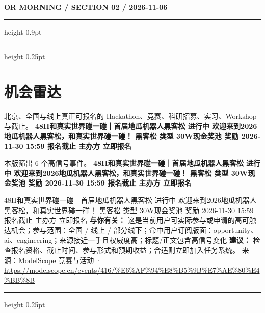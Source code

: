\documentclass[10.5pt]{ctexart}
\begin{document}
\newpage
{\small\bfseries OR MORNING / SECTION 02 / 2026-11-06}
\vspace{2mm}
\hrule height 0.9pt
\vspace{1.5mm}
\hrule height 0.25pt
\vspace{4mm}
\section*{机会雷达}
{\color{ormuted} 北京、全国与线上真正可报名的 Hackathon、竞赛、科研招募、实习、Workshop 与截止。}
\vspace{2mm}
{\LARGE\bfseries 48H和真实世界碰一碰｜首届地瓜机器人黑客松 进行中 欢迎来到2026地瓜机器人黑客松，和真实世界碰一碰！ 黑客松 类型 30W现金奖池 奖励 2026-11-30 15:59 报名截止 主办方 立即报名}\par
\vspace{1mm}
{\color{ormuted} 本版筛出 6 个高信号事件。}
\vspace{3mm}
{\Large\bfseries 48H和真实世界碰一碰｜首届地瓜机器人黑客松 进行中 欢迎来到2026地瓜机器人黑客松，和真实世界碰一碰！ 黑客松 类型 30W现金奖池 奖励 2026-11-30 15:59 报名截止 主办方 立即报名}\par
48H和真实世界碰一碰｜首届地瓜机器人黑客松 进行中 欢迎来到2026地瓜机器人黑客松，和真实世界碰一碰！ 黑客松 类型 30W现金奖池 奖励 2026-11-30 15:59 报名截止 主办方 立即报名
\textbf{与你有关：} 这是当前用户可实际参与或申请的高可触达机会；参与范围：全国 / 线上 / 部分线下；命中用户订阅版面：opportunity、ai、engineering；来源接近一手且权威度高；标题/正文包含高信号变化
\textbf{建议：} 检查报名资格、截止时间、参与形式和预期收益；合适则立即加入任务系统。
{\footnotesize\color{ormuted} 来源：ModelScope 竞赛与活动 · \url{https://modelscope.cn/events/416/%E6%AF%94%E8%B5%9B%E7%AE%80%E4%BB%8B}}
\vspace{4mm}
\hrule height 0.25pt
\vspace{3mm}
\end{document}
